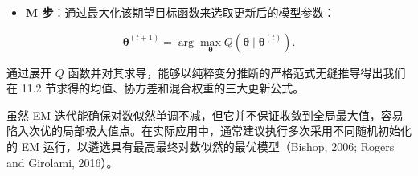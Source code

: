 \begin{itemize}
\item \textbf{M 步}：通过最大化该期望目标函数来选取更新后的模型参数：
\end{itemize}

\begin{equation}
\boldsymbol{\theta}^{(t+1)} = \arg\max_{\boldsymbol{\theta}} Q(\boldsymbol{\theta} \mid \boldsymbol{\theta}^{(t)}) .
\tag{11.74}
\end{equation}

通过展开 $ Q $ 函数并对其求导，能够以纯粹变分推断的严格范式无缝推导得出我们在 11.2 节求得的均值、协方差和混合权重的三大更新公式。

虽然 EM 迭代能确保对数似然单调不减，但它并不保证收敛到全局最大值，容易陷入次优的局部极大值点。在实际应用中，通常建议执行多次采用不同随机初始化的 EM 运行，以遴选具有最高最终对数似然的最优模型（Bishop, 2006; Rogers and Girolami, 2016）。
